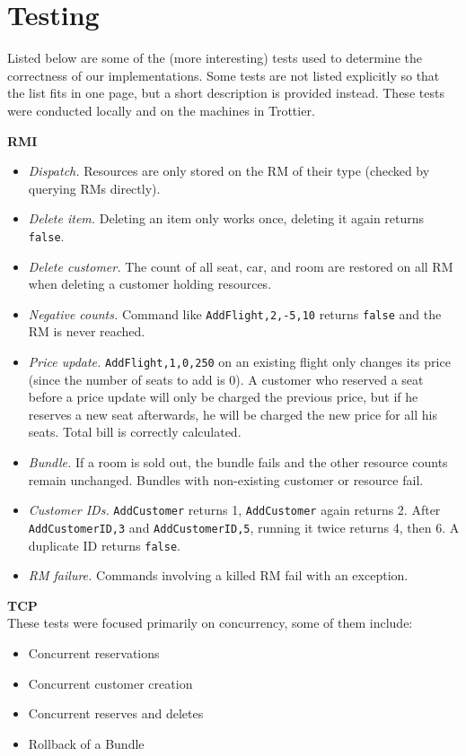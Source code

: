 \documentclass[10pt]{article}
\newcommand{\code}[1]{\lstinline{#1}}
\begin{document}
\section{Testing}

Listed below are some of the (more interesting) tests used to determine the
correctness of our implementations. Some tests are not listed explicitly so that
the list fits in one page, but a short description is provided instead. These
tests were conducted locally and on the machines in Trottier.

\textbf{RMI}
\begin{itemize}
\item \emph{Dispatch.} Resources are only stored on the RM of their type
  (checked by querying RMs directly).
\item \emph{Delete item.} Deleting an item only works once, deleting it again
  returns \code{false}.
\item \emph{Delete customer.} The count of all seat, car, and room are restored
  on all RM when deleting a customer holding resources.
\item \emph{Negative counts.} Command like \code{AddFlight,2,-5,10} returns
  \code{false} and the RM is never reached.
\item \emph{Price update.} \code{AddFlight,1,0,250} on an existing flight only
  changes its price (since the number of seats to add is 0). A customer who
  reserved a seat before a price update will only be charged the previous price,
  but if he reserves a new seat afterwards, he will be charged the new price for
  all his seats. Total bill is correctly calculated.
\item \emph{Bundle.} If a room is sold out, the bundle fails and the other
  resource counts remain unchanged. Bundles with non-existing customer or
  resource fail.
\item \emph{Customer IDs.} \code{AddCustomer} returns 1, \code{AddCustomer}
  again returns 2. After \code{AddCustomerID,3} and \code{AddCustomerID,5},
  running it twice returns 4, then 6. A duplicate ID returns \code{false}.
\item \emph{RM failure.} Commands involving a killed RM fail with an exception.
\end{itemize}

\textbf{TCP}
\\These tests were focused primarily on concurrency, some of them include:
\begin{itemize}
\item Concurrent reservations
\item Concurrent customer creation
\item Concurrent reserves and deletes
\item Rollback of a Bundle
\end{itemize}
\end{document}
